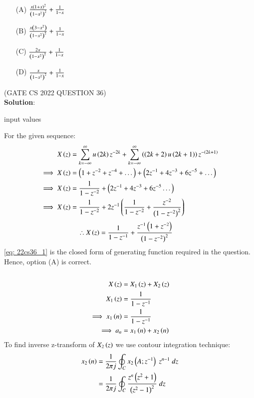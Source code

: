 \documentclass[journal,12pt,twocolumn]{IEEEtran}
\theoremstyle{remark}
\begin{document}
\begin{enumerate}
    \item[(A)] $ \frac{x\left(1+x\right)^2}{\left(1-x^2\right)^2} + \frac{1}{1-x}$
    \item[(B)]$ \frac{x\left(3-x^2\right)}{\left(1-x^2\right)^2} + \frac{1}{1-x}$
    \item[(C)] $ \frac{2x}{\left(1-x^2\right)^2} + \frac{1}{1-x}$
    \item[(D)] $ \frac{x}{\left(1-x^2\right)^2} + \frac{1}{1-x}$  
\end{enumerate}
\hfill(GATE CS 2022 QUESTION 36)\\
\textbf{Solution}:\\
\begin{table}[h!] 
\centering

\caption{input values}
\label{tab: Table2022cs36}
\end{table}
For the given sequence:
\begin{align}
X\left(z\right) &= \sum_{k=-\infty}^{\infty} u\left(2k\right) z^{-2k}+ \sum_{k=-\infty}^{\infty} \left(\left(2k+2\right)u\left(2k+1\right)\right) z^{-\left(2k+1\right)}\\
\implies X\left(z\right) &= \left(1+z^{-2}+z^{-4} + \dots\right) + \left(2z^{-1}+4z^{-3} + 6z^{-5} + \dots\right)\\
\implies X\left(z\right) &= \frac{1}{1-z^{-2}} + \left(2z^{-1}+4z^{-3}+6z^{-5} \dots\right)\\
\implies X\left(z\right) &= \frac{1}{1-z^{-2}} +2z^{-1}\left(\frac{1}{1-z^{-2}}+\frac{z^{-2}}{\left(1-z^{-2}\right)^2}\right)
\end{align}
\begin{align}
\therefore X\left(z\right) &= \frac{1}{1-z^{-1}} + \frac{z^{-1}\left(1+z^{-2}\right)}{\left(1-z^{-2}\right)^2}\label{eq: 22cs36_1}
\end{align}
\eqref{eq: 22cs36_1} is the closed form of generating function required in the question.\\
Hence, option (A) is correct.\\\\
\begin{align}
X\left(z\right)&=X_1\left(z\right)+X_2\left(z\right)\\
X_1\left(z\right)&=\frac{1}{1-z^{-1}}\\
\implies x_1\left(n\right) &= \frac{1}{1-z^{-1}}\\
\implies a_n&=  x_1\left(n\right)+ x_2\left(n\right)
\end{align}
To find inverse z-transform of $ X_2\left(z\right)$ we use contour integration technique:
\begin{align}
    x_2\left(n\right)&=\frac{1}{2\pi j}\oint_{C}x_2\left(A;z^{-1}\right) \;z^{n-1} \;dz  \\
    &=\frac{1}{2\pi j}\oint_{C}\frac{z^{n}\left(z^2+1\right)}{\left(z^2-1\right)^2} \;dz 
\end{align}
\end{document}
